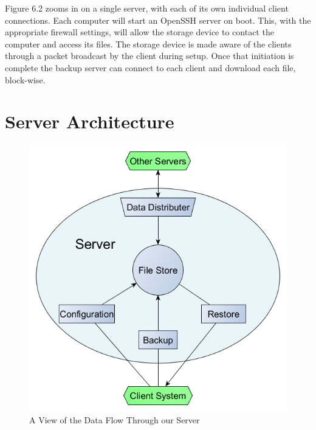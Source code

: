 Figure 6.2 zooms in on a single server, with each of its own individual client connections. Each computer will start an OpenSSH server on boot. This, with the appropriate firewall settings, will allow the storage device to contact the computer and access its files. The storage device is made aware of the clients through a packet broadcast by the client during setup. Once that initiation is complete the backup server can connect to each client and download each file, block-wise.


\clearpage


\section{Server Architecture}

\begin{figure}[hb]
\centering
\includegraphics[scale=0.5]{images/architechure-diagram2.png}
\caption{A View of the Data Flow Through our Server}
\end{figure}

